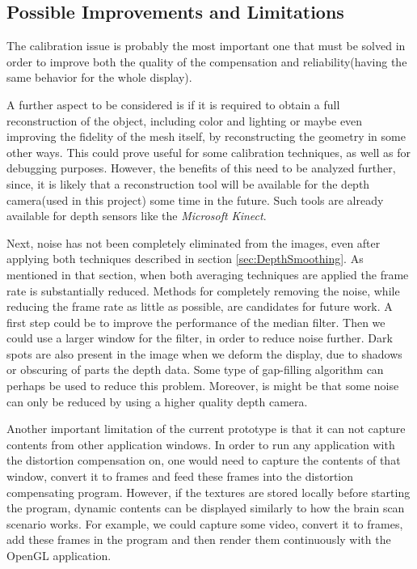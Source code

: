 \documentclass[]{article}
\begin{document}
\subsection{Possible Improvements and Limitations}

The calibration issue is probably the most important one that must be solved in order to improve both the quality of the compensation and reliability(having the same behavior for the whole display). 

A further aspect to be considered is if it is required to obtain a full reconstruction of the object, including color and lighting or maybe even improving the fidelity of the mesh itself, by reconstructing the geometry in some other ways. This could prove useful for some calibration techniques, as well as for debugging purposes. However, the benefits of this need to be analyzed further, since, it is likely that a reconstruction tool will be available for the depth camera(used in this project) some time in the future. Such tools are already available for depth sensors like the \textit{Microsoft Kinect}.

Next, noise has not been completely eliminated from the images, even after applying both techniques described in section \ref{sec:DepthSmoothing}. As mentioned in that section, when both averaging techniques are applied the frame rate is substantially reduced. Methods for completely removing the noise, while reducing the frame rate as little as possible, are candidates for future work. A first step could be to improve the performance of the median filter. Then we could use a larger window for the filter, in order to reduce noise further. Dark spots are also present in the image when we deform the display, due to shadows or  obscuring of parts the depth data. Some type of gap-filling algorithm can perhaps be used to reduce this problem.  Moreover, is might be that some noise can only be reduced by using a higher quality depth camera.

Another important limitation of the current prototype is that it can not capture contents from other application windows. In order to run any application with the distortion compensation on, one would need to capture the contents of that window, convert it to frames and feed these frames into the distortion compensating program. However, if the textures are stored locally before starting the program, dynamic contents can be displayed similarly to how the brain scan scenario works. For example, we could capture some video, convert it to frames, add these frames in the program and then render them continuously with the OpenGL application.
\end{document}
